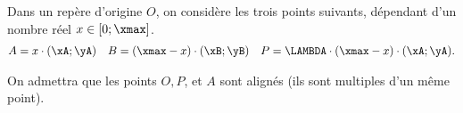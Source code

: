 %

\pagestyle{fancy}
\fancyhead[R]{\today}

Dans un repère d'origine $O$, on considère les trois points suivants, dépendant d'un nombre réel $x \in [0;\xmax]$.
	\begin{align*}
		A  = x \cdot (\xA;\yA) && B = (\xmax-x)\cdot(\xB ; \yB) && P = \LAMBDA \cdot (\xmax-x)\cdot (\xA;\yA).
	\end{align*}

On admettra que les points $O, P$, et $A$ sont alignés (ils sont multiples d'un même point).
	
	
	
%
%	
	
